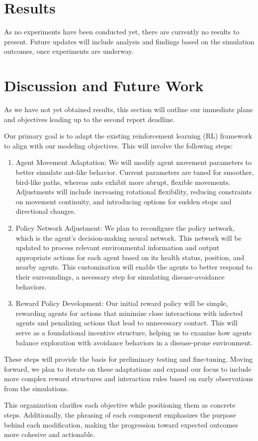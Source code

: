 \documentclass[9pt]{IEEEtran}
\begin{document}
\section{Results}

As no experiments have been conducted yet, there are currently no results to present. Future updates will include analysis and findings based on the simulation outcomes, once experiments are underway.

\section{Discussion and Future Work}

As we have not yet obtained results, this section will outline our immediate plans and objectives leading up to the second report deadline.

Our primary goal is to adapt the existing reinforcement learning (RL) framework to align with our modeling objectives. This will involve the following steps:

\begin{enumerate}
    \item Agent Movement Adaptation: We will modify agent movement parameters to better simulate ant-like behavior. Current parameters are tuned for smoother, bird-like paths, whereas ants exhibit more abrupt, flexible movements. Adjustments will include increasing rotational flexibility, reducing constraints on movement continuity, and introducing options for sudden stops and directional changes.
    \item Policy Network Adjustment: We plan to reconfigure the policy network, which is the agent’s decision-making neural network. This network will be updated to process relevant environmental information and output appropriate actions for each agent based on its health status, position, and nearby agents. This customization will enable the agents to better respond to their surroundings, a necessary step for simulating disease-avoidance behaviors.
    \item Reward Policy Development: Our initial reward policy will be simple, rewarding agents for actions that minimize close interactions with infected agents and penalizing actions that lead to unnecessary contact. This will serve as a foundational incentive structure, helping us to examine how agents balance exploration with avoidance behaviors in a disease-prone environment.
\end{enumerate}

These steps will provide the basis for preliminary testing and fine-tuning. Moving forward, we plan to iterate on these adaptations and expand our focus to include more complex reward structures and interaction rules based on early observations from the simulations.

This organization clarifies each objective while positioning them as concrete steps. Additionally, the phrasing of each component emphasizes the purpose behind each modification, making the progression toward expected outcomes more cohesive and actionable.

\printbibliography
\end{document}
